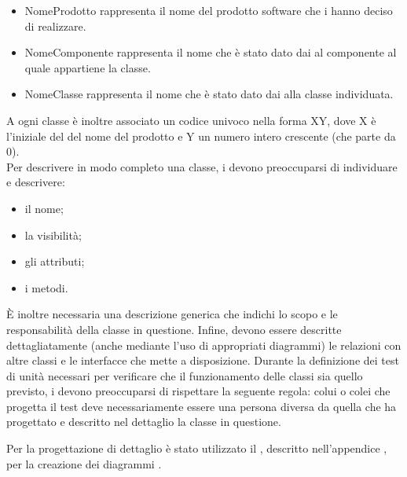 					\begin{itemize}
						\item NomeProdotto rappresenta il nome del prodotto software che i  hanno deciso di realizzare.
						\item NomeComponente rappresenta il nome che è stato dato dai  al componente al quale appartiene la classe.
						\item NomeClasse rappresenta il nome che è stato dato dai  alla classe individuata.
					\end{itemize}
					A ogni classe è inoltre associato un codice univoco nella forma XY, dove X è l'iniziale del del nome del prodotto e Y un numero intero crescente (che parte da 0).\\
				 \label{sec:DescrizioneClasse}
					Per descrivere in modo completo una classe, i  devono preoccuparsi di individuare e descrivere:
					\begin{itemize}
						\item il nome;
						\item la visibilità;
						\item gli attributi;
						\item i metodi.
					\end{itemize}
					È inoltre necessaria una descrizione generica che indichi lo scopo e le responsabilità della classe in questione. Infine, devono essere descritte dettagliatamente (anche mediante l'uso di appropriati diagrammi) le relazioni con altre classi e le interfacce che mette a disposizione.
				 \label{sec:TestUnita}
					Durante la definizione dei test di unità necessari per verificare che il funzionamento delle classi sia quello previsto, i  devono preoccuparsi di rispettare la seguente regola: colui o colei che progetta il test deve necessariamente essere una persona diversa da quella che ha progettato e descritto nel dettaglio la classe in questione.

				Per la progettazione di dettaglio è stato utilizzato il  , descritto nell'appendice , per la creazione dei diagrammi .

